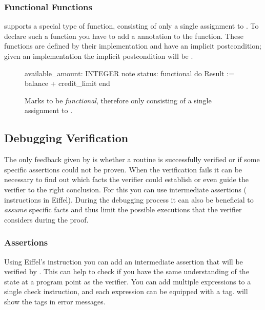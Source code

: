 \subsubsection*{Functional Functions}

\AutoProof supports a special type of function, consisting of only a single assignment to . To declare such a function you have to add a  annotation to the function. These functions are defined by their implementation and have an implicit postcondition; given an implementation  the implicit postcondition will be .

\begin{figure}
\begin{erunning}
available_amount: INTEGER
	note
		status: functional
	do
		Result := balance + credit_limit
	end
\end{erunning}
\hspace{0.5cm}
\caption*{Marks  to be \emph{functional}, therefore only consisting of a single assignment to .}
\end{figure}


\subsection{Debugging Verification}

The only feedback given by \AutoProof is whether a routine is successfully verified or if some specific assertions could not be proven. When the verification fails it can be necessary to find out which facts the verifier could establish or even guide the verifier to the right conclusion. For this you can use intermediate assertions ( instructions in Eiffel). During the debugging process it can also be beneficial to \emph{assume} specific facts and thus limit the possible executions that the verifier considers during the proof.

\subsubsection*{Assertions}

Using Eiffel's  instruction you can add an intermediate assertion that will be verified by \AutoProof. This can help to check if you have the same understanding of the state at a program point as the verifier. You can add multiple expressions to a single check instruction, and each expression can be equipped with a tag. \AutoProof will show the tags in error messages.

